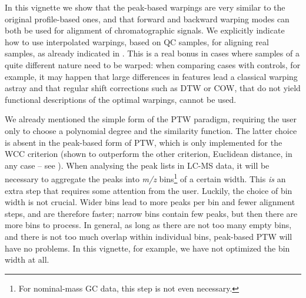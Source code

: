 \documentclass[a4paper,11pt]{article}
\begin{document}
In this vignette we show that the peak-based warpings are very similar
to the original profile-based ones, and that forward and backward
warping modes can both be used for alignment of chromatographic
signals. We explicitly indicate how to use interpolated warpings,
based on QC samples, for aligning real samples, as already indicated
in \citet{Eilers2004}. This is a real bonus in cases where samples of
a quite different nature need to be warped: when comparing cases with
controls, for example, it may happen that large differences in
features lead a classical warping astray and that regular shift
corrections such as DTW or COW, that do not yield functional
descriptions of the optimal warpings, cannot be used.

We already mentioned the simple form of the PTW paradigm, requiring
the user only to choose a polynomial degree and the similarity
function. The latter choice is absent in the peak-based form of PTW,
which is only implemented for the WCC criterion (shown to outperform
the other criterion, Euclidean distance, in any case -- see
\citet{Bloemberg2010}). When analysing the peak lists in LC-MS data,
it will be necessary to aggregate the peaks into \emph{m/z}
bins\footnote{For nominal-mass GC data, this step is not even
  necessary.} of a certain width. This \emph{is} an extra step that
requires some attention from the user. Luckily, the choice of bin
width is not crucial. Wider bins lead to more peaks per bin and fewer
alignment steps, and are therefore faster; narrow bins contain few
peaks, but then there are more bins to process. In general, as long as
there are not too many empty bins, and there is not too much overlap
within individual bins, peak-based PTW will have no problems. In this
vignette, for example, we have not optimized the bin width at all.

\clearpage


 

\clearpage
\end{document}
